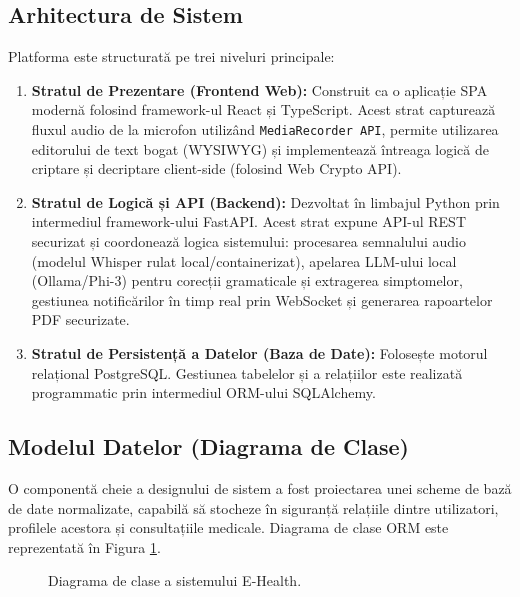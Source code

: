 \subsection{Arhitectura de Sistem}
Platforma este structurată pe trei niveluri principale:
\begin{enumerate}
    \item \textbf{Stratul de Prezentare (Frontend Web):} Construit ca o aplicație SPA modernă folosind framework-ul React și TypeScript. Acest strat capturează fluxul audio de la microfon utilizând \texttt{MediaRecorder API}, permite utilizarea editorului de text bogat (WYSIWYG) și implementează întreaga logică de criptare și decriptare client-side (folosind Web Crypto API).
    \item \textbf{Stratul de Logică și API (Backend):} Dezvoltat în limbajul Python prin intermediul framework-ului FastAPI. Acest strat expune API-ul REST securizat și coordonează logica sistemului: procesarea semnalului audio (modelul Whisper rulat local/containerizat), apelarea LLM-ului local (Ollama/Phi-3) pentru corecții gramaticale și extragerea simptomelor, gestiunea notificărilor în timp real prin WebSocket și generarea rapoartelor PDF securizate.
    \item \textbf{Stratul de Persistență a Datelor (Baza de Date):} Folosește motorul relațional PostgreSQL. Gestiunea tabelelor și a relațiilor este realizată programmatic prin intermediul ORM-ului SQLAlchemy.
\end{enumerate}

\subsection{Modelul Datelor (Diagrama de Clase)}
O componentă cheie a designului de sistem a fost proiectarea unei scheme de bază de date normalizate, capabilă să stocheze în siguranță relațiile dintre utilizatori, profilele acestora și consultațiile medicale. Diagrama de clase ORM este reprezentată în Figura \ref{fig:class_diagram}.

\begin{figure}[H]
    \centering
    \color{red}
    \caption{Diagrama de clase a sistemului E-Health.}
    \label{fig:class_diagram}
\end{figure}

